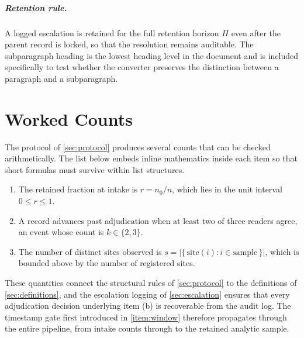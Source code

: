 \documentclass[11pt]{article}
\begin{document}
\subparagraph{Retention rule.}
A logged escalation is retained for the full retention horizon $H$ even after the
parent record is locked, so that the resolution remains auditable. The
subparagraph heading is the lowest heading level in the document and is included
specifically to test whether the converter preserves the distinction between a
paragraph and a subparagraph.

\section{Worked Counts}
\label{sec:counts}

The protocol of \cref{sec:protocol} produces several counts that can be checked
arithmetically. The list below embeds inline mathematics inside each item so
that short formulas must survive within list structures.

\begin{enumerate}[label=(\alph*)]
\item The retained fraction at intake is
  $r = n_0 / n$, which lies in the unit interval $0 \leq r \leq 1$.
\item A record advances past adjudication when at least two of three readers
  agree, an event whose count is $k \in \{2, 3\}$.
\item The number of distinct sites observed is
  $s = \lvert \{\, \text{site}(i) : i \in \text{sample} \,\} \rvert$, which is
  bounded above by the number of registered sites.
\end{enumerate}

These quantities connect the structural rules of \cref{sec:protocol} to the
definitions of \cref{sec:definitions}, and the escalation logging of
\cref{sec:escalation} ensures that every adjudication decision underlying item
(b) is recoverable from the audit log. The timestamp gate first introduced in
\cref{item:window} therefore propagates through the entire pipeline, from intake
counts through to the retained analytic sample.
\end{document}
